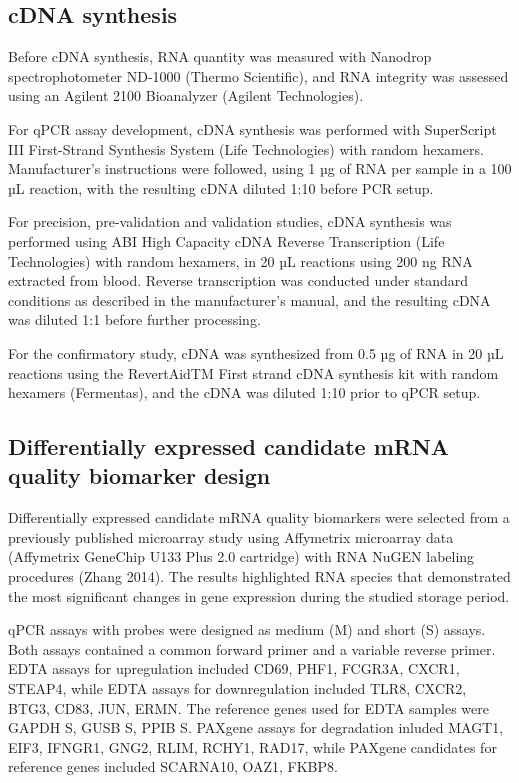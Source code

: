 \documentclass[fleqn,10pt]{wlscirep}
\begin{document}
\subsection*{cDNA synthesis}
Before cDNA synthesis, RNA quantity was measured with Nanodrop spectrophotometer ND-1000 (Thermo Scientific), and RNA integrity was assessed using an Agilent 2100 Bioanalyzer (Agilent Technologies).

For qPCR assay development, cDNA synthesis was performed with SuperScript III First-Strand Synthesis System (Life Technologies) with random hexamers. Manufacturer’s  instructions were followed, using 1 µg of RNA per sample in a 100 µL reaction, with the resulting cDNA diluted 1:10 before PCR setup. 

For precision, pre-validation and validation studies, cDNA synthesis was performed using ABI High Capacity cDNA Reverse Transcription (Life Technologies) with random hexamers, in 20 µL reactions using 200 ng RNA extracted from blood. Reverse transcription was conducted under standard conditions as described in the manufacturer's manual, and the resulting cDNA was diluted 1:1 before further processing. 

For the confirmatory study, cDNA was synthesized from 0.5 µg of RNA in 20 µL reactions using the RevertAidTM First strand cDNA synthesis kit with random hexamers (Fermentas), and the cDNA was diluted 1:10 prior to qPCR setup.

\subsection*{Differentially expressed candidate mRNA quality biomarker design}
Differentially expressed candidate mRNA quality biomarkers were selected from a previously published microarray study using Affymetrix microarray data (Affymetrix GeneChip U133 Plus 2.0 cartridge) with RNA NuGEN labeling procedures (Zhang 2014). The results highlighted RNA species that demonstrated the most significant changes in gene expression during the studied storage period.

qPCR assays with probes were designed as medium (M) and short (S) assays. Both assays contained a common forward primer and a variable reverse primer. EDTA assays for upregulation included CD69, PHF1, FCGR3A, CXCR1, STEAP4, while EDTA assays for downregulation included TLR8, CXCR2, BTG3, CD83, JUN, ERMN. The reference genes used for EDTA samples were GAPDH S, GUSB S, PPIB S. PAXgene assays for degradation inluded MAGT1, EIF3, IFNGR1, GNG2, RLIM, RCHY1, RAD17, while PAXgene candidates for reference genes included SCARNA10, OAZ1, FKBP8. 
\end{document}
